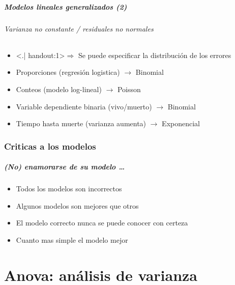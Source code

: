 \documentclass[mathserif]{beamer}
\begin{document}
\begin{frame}[label=glm2]
   \frametitle{Modelos lineales generalizados (2)}
   \framesubtitle{Varianza no constante / residuales no normales}
    \begin{itemize}[<+-| handout:1>]
      \item[] \alert<.| handout:1>{$\Rightarrow$ Se puede especificar la distribuci\'on de los errores}
      \medskip
      \item<2-| handout:1> Proporciones (regresi\'on logistica) $\rightarrow$ Binomial
      \item<2-| handout:1> Conteos (modelo log-lineal) $\rightarrow$ Poisson
      \item<2-| handout:1> Variable dependiente binaria (vivo/muerto) $\rightarrow$ Binomial
      \item<2-| handout:1> Tiempo hasta muerte (varianza aumenta) $\rightarrow$ Exponencial
   \end{itemize}
\end{frame}%




\section{Criticas a los modelos}

\begin{frame}[label=modcrit1]
   \frametitle{(No) enamorarse de su modelo \ldots}
    \begin{itemize}
      \item Todos los modelos son incorrectos
      \item Algunos modelos son mejores que otros
      \item El modelo correcto nunca se puede conocer con certeza
      \item Cuanto mas simple el modelo mejor
   \end{itemize}
\end{frame}%







\part[Anova]{Anova: an\'alisis de varianza}
\end{document}
